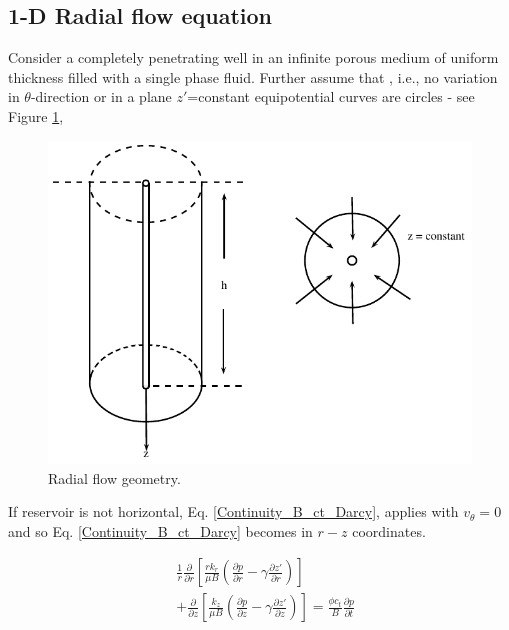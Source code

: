 \documentclass{llncs}
\numberwithin{equation}{section}
\numberwithin{figure}{section}
\numberwithin{table}{section}
\begin{document}
    \subsection{1-D Radial flow equation}
    Consider a completely penetrating well in an infinite porous medium of uniform thickness filled with a single phase fluid. Further assume that , i.e., no variation in $\theta$-direction or in a plane $z'$=constant equipotential curves are circles - see Figure \ref{Radial_Flow},
    \begin{figure}
        \begin{center}
        \includegraphics[scale=1]{Radial_Flow.pdf}
        \caption{Radial flow geometry.}
        \end{center}
        \label{Radial_Flow}
    \end{figure}

    If reservoir is not horizontal,  Eq. \ref{Continuity_B_ct_Darcy}, applies with $v_{\theta}=0$ and so Eq. \ref{Continuity_B_ct_Darcy} becomes in $r-z$ coordinates.

    \begin{equation}
        \begin{split}
    & \frac{1}{r}\frac{\partial }{\partial r}\left[ \frac{r{{k}_{r}}}{\mu B}\left( \frac{\partial p}{\partial r}-\gamma \frac{\partial z'}{\partial r} \right) \right] \\
    & +\frac{\partial }{\partial z}\left[ \frac{{{k}_{z}}}{\mu B}\left( \frac{\partial p}{\partial z}-\gamma \frac{\partial z'}{\partial z} \right) \right]=\frac{\phi {{c}_{t}}}{B}\frac{\partial p}{\partial t} \\
    \end{split}
        \label{Radial_Flow}
    \end{equation}
\end{document}
